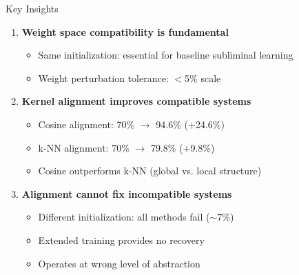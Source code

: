 \documentclass{beamer}
\begin{document}
\begin{frame}{Key Insights}

\begin{enumerate}
    \item \textbf{Weight space compatibility is fundamental}
    \begin{itemize}
        \item Same initialization: essential for baseline subliminal learning
        \item Weight perturbation tolerance: $<$5\% scale
    \end{itemize}

    \vspace{0.5em}

    \item \textbf{Kernel alignment improves compatible systems}
    \begin{itemize}
        \item Cosine alignment: 70\% $\to$ 94.6\% (+24.6\%)
        \item k-NN alignment: 70\% $\to$ 79.8\% (+9.8\%)
        \item Cosine outperforms k-NN (global vs. local structure)
    \end{itemize}

    \vspace{0.5em}

    \item \textbf{Alignment cannot fix incompatible systems}
    \begin{itemize}
        \item Different initialization: all methods fail ($\sim$7\%)
        \item Extended training provides no recovery
        \item Operates at wrong level of abstraction
    \end{itemize}
\end{enumerate}

\end{frame}
\end{document}
